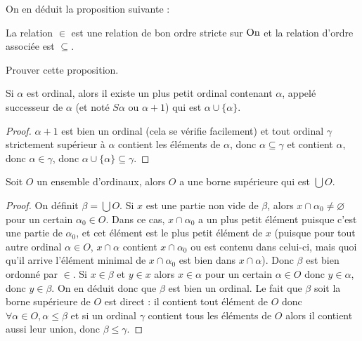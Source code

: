 On en déduit la proposition suivante :

\begin{prop}
    La relation $\in$ est une relation de bon ordre stricte sur $\mathrm{On}$ et la relation d'ordre associée est $\subseteq$.
\end{prop}

\begin{exo}
    Prouver cette proposition.
\end{exo}

\begin{defi}[Successeur]
    Si $\alpha$ est ordinal, alors il existe un plus petit ordinal contenant $\alpha$, appelé successeur de $\alpha$ (et noté $S\alpha$ ou $\alpha+1$) qui est $\alpha \cup \{\alpha\}$.
\end{defi}

\begin{proof}
    $\alpha + 1$ est bien un ordinal (cela se vérifie facilement) et tout ordinal $\gamma$ strictement supérieur à $\alpha$ contient les éléments de $\alpha$, donc $\alpha \subseteq \gamma$ et contient $\alpha$, donc $\alpha\in\gamma$, donc $\alpha\cup\{\alpha\}\subseteq \gamma$.
\end{proof}

\begin{prop}
    Soit $O$ un ensemble d'ordinaux, alors $O$ a une borne supérieure qui est $\bigcup O$.
\end{prop}

\begin{proof}
    On définit $\beta = \bigcup O$. Si $x$ est une partie non vide de $\beta$, alors $x\cap \alpha_0 \neq \varnothing$ pour un certain $\alpha_0\in O$. Dans ce cas, $x\cap \alpha_0$ a un plus petit élément puisque c'est une partie de $\alpha_0$, et cet élément est le plus petit élément de $x$ (puisque pour tout autre ordinal $\alpha\in O$, $x\cap \alpha$ contient $x\cap \alpha_0$ ou est contenu dans celui-ci, mais quoi qu'il arrive l'élément minimal de $x\cap \alpha_0$ est bien dans $x\cap \alpha$). Donc $\beta$ est bien ordonné par $\in$. Si $x\in \beta$ et $y\in x$ alors $x\in \alpha$ pour un certain $\alpha \in O$ donc $y\in \alpha$, donc $y\in \beta$. On en déduit donc que $\beta$ est bien un ordinal. Le fait que $\beta$ soit la borne supérieure de $O$ est direct : il contient tout élément de $O$ donc $\forall \alpha \in O, \alpha \leq \beta$ et si un ordinal $\gamma$ contient tous les éléments de $O$ alors il contient aussi leur union, donc $\beta \leq \gamma$.
\end{proof}

